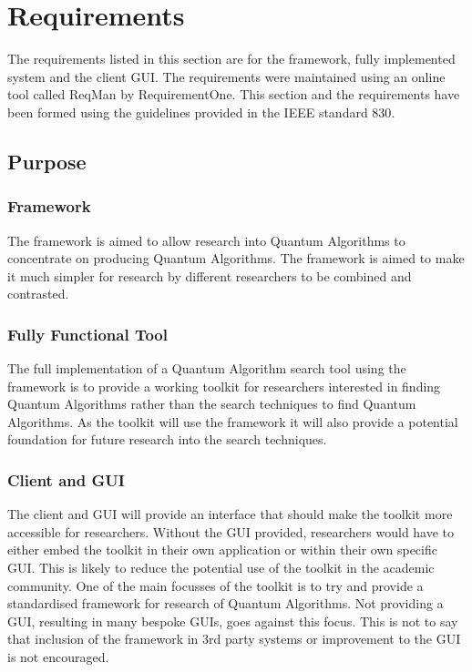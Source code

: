 \documentclass[authoryearcitations]{UoYCSproject}
\begin{document}


\chapter{Requirements}
The requirements listed in this section are for the framework, fully implemented system and the client GUI.
The requirements were maintained using an online tool called ReqMan\cite{reqman} by RequirementOne.
This section and the requirements have been formed using the guidelines provided in the IEEE standard 830\cite{ieee830}.

\section{Purpose}
\subsection{Framework}
The framework is aimed to allow research into Quantum Algorithms to concentrate on producing Quantum Algorithms.
The framework is aimed to make it much simpler for research by different researchers to be combined and contrasted.

\subsection{Fully Functional Tool}
The full implementation of a Quantum Algorithm search tool using the framework is to provide a working toolkit for researchers interested in finding Quantum Algorithms rather than the search techniques to find Quantum Algorithms.
As the toolkit will use the framework it will also provide a potential foundation for future research into the search techniques.

\subsection{Client and GUI}
The client and GUI will provide an interface that should make the toolkit more accessible for researchers.
Without the GUI provided, researchers would have to either embed the toolkit in their own application or within their own specific GUI.
This is likely to reduce the potential use of the toolkit in the academic community.
One of the main focusses of the toolkit is to try and provide a standardised framework for research of Quantum Algorithms.
Not providing a GUI, resulting in many bespoke GUIs, goes against this focus.
This is not to say that inclusion of the framework in 3rd party systems or improvement to the GUI is not encouraged.
\end{document}
